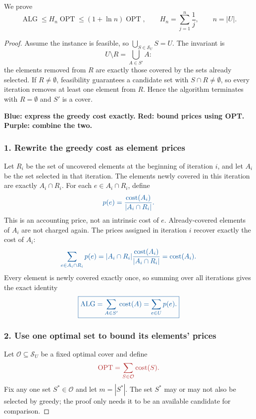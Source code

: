 \documentclass[10pt]{article}
\theoremstyle{definition}
\newcommand{\OPT}{\operatorname{OPT}}
\newcommand{\ALG}{\operatorname{ALG}}
\begin{document}
We prove
\[
  \ALG\leq H_n\OPT\leq(1+\ln n)\OPT,
  \qquad
  H_n=\sum_{j=1}^{n}\frac1j,\qquad n=|U|.
\]

\begin{proof}
Assume the instance is feasible, so
$\bigcup_{S\in\mathcal{S}_U}S=U$. The invariant is
\[
  U\setminus R=\bigcup_{A\in S'}A:
\]
the elements removed from $R$ are exactly those covered by the sets already
selected. If $R\neq\emptyset$, feasibility guarantees a candidate set with
$S\cap R\neq\emptyset$, so every iteration removes at least one element from
$R$. Hence the algorithm terminates with $R=\emptyset$ and $S'$ is a cover.

\medskip
\noindent
\textcolor{algblue}{\textbf{Blue: express the greedy cost exactly.}}\quad
\textcolor{optred}{\textbf{Red: bound prices using OPT.}}\quad
\textcolor{bridgepurple}{\textbf{Purple: combine the two.}}

\subsubsection*{\textcolor{algblue}{1. Rewrite the greedy cost as element prices}}

Let $R_i$ be the set of uncovered elements at the beginning of iteration $i$,
and let $A_i$ be the set selected in that iteration. The elements newly
covered in this iteration are exactly $A_i\cap R_i$. For each
$e\in A_i\cap R_i$, define
\[
  \color{algblue}
  p(e)=\frac{\operatorname{cost}(A_i)}{|A_i\cap R_i|}.
\]
This is an accounting price, not an intrinsic cost of $e$. Already-covered
elements of $A_i$ are not charged again. The prices assigned in iteration
$i$ recover exactly the cost of $A_i$:
\[
  \color{algblue}
  \sum_{e\in A_i\cap R_i}p(e)
  =|A_i\cap R_i|\frac{\operatorname{cost}(A_i)}{|A_i\cap R_i|}
  =\operatorname{cost}(A_i).
\]
Every element is newly covered exactly once, so summing over all iterations
gives the exact identity
\[
  \color{algblue}
  \boxed{\ALG=\sum_{A\in S'}\operatorname{cost}(A)
  =\sum_{e\in U}p(e).}
\]

\subsubsection*{\textcolor{optred}{2. Use one optimal set to bound its elements' prices}}

Let $\mathcal{O}\subseteq\mathcal{S}_U$ be a fixed optimal cover and define
\[
  \color{optred}
  \OPT=\sum_{S\in\mathcal{O}}\operatorname{cost}(S).
\]
Fix any one set $S^*\in\mathcal{O}$ and let $m=|S^*|$. The set $S^*$ may or
may not also be selected by greedy; the proof only needs it to be an available
candidate for comparison.


\end{proof}
\end{document}
